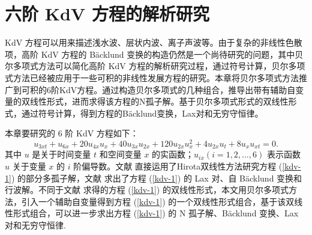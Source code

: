 \chapter{六阶 KdV 方程的解析研究}
KdV 方程可以用来描述浅水波、层状内波、离子声波等。由于复杂的非线性色散项，高阶 KdV 方程的 Bäcklund 变换的构造仍然是一个尚待研究的问题，其中贝尔多项式方法可以简化高阶 KdV 方程的解析研究过程，通过符号计算，贝尔多项式方法已经被应用于一些可积的非线性发展方程的研究。本章将贝尔多项式方法推广到可积的6阶KdV方程。通过构造贝尔多项式的几种组合，推导出带有辅助自变量的双线性形式，进而求得该方程的N孤子解。基于贝尔多项式形式的双线性形式，通过符号计算，得到方程的Bäcklund变换，Lax对和无穷守恒律。

本章要研究的 6 阶 KdV 方程如下：
\begin{equation}
u_{3xt}+ u_{6x}+ 20u_{4x}u_x+40u_{3x}u_{2x}+120u_{2x}u_{x}^2+4u_{2x}u_t+8u_xu_{xt}=0.\label{kdv-1}
\end{equation}
其中 $u$ 是关于时间变量 $t$ 和空间变量 $x$ 的实函数；$u_{ix} (i=1,2,…,6)$ 表示函数 $u$ 关于变量 $x$ 的 $i$ 阶偏导数。文献 \cite{kdv-3} 直接运用了Hirota双线性方法研究方程 (\ref{kdv-1}) 的部分多孤子解，文献 \cite{kdv-4} 求出了方程 (\ref{kdv-1}) 的 Lax 对、自 B\"{a}cklund 变换和行波解。不同于文献\cite{kdv-3} 求得的方程 (\ref{kdv-1}) 的双线性形式，本文用贝尔多项式方法，引入一个辅助自变量得到方程 (\ref{kdv-1}) 的一个双线性形式组合，基于该双线性形式组合，可以进一步求出方程 (\ref{kdv-1}) 的 N 孤子解、B\"{a}cklund 变换、Lax 对和无穷守恒律.
